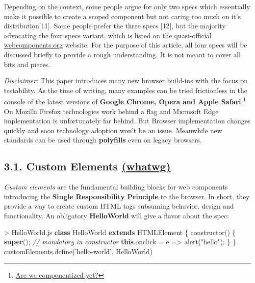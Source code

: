 \documentclass[]{article}
\newenvironment{Shaded}{}{}
\newcommand{\KeywordTok}[1]{\textcolor[rgb]{0.00,0.44,0.13}{\textbf{{#1}}}}
\newcommand{\StringTok}[1]{\textcolor[rgb]{0.25,0.44,0.63}{{#1}}}
\newcommand{\CommentTok}[1]{\textcolor[rgb]{0.38,0.63,0.69}{\textit{{#1}}}}
\newcommand{\VariableTok}[1]{\textcolor[rgb]{0.10,0.09,0.49}{{#1}}}
\newcommand{\OperatorTok}[1]{\textcolor[rgb]{0.40,0.40,0.40}{{#1}}}
\newcommand{\AttributeTok}[1]{\textcolor[rgb]{0.49,0.56,0.16}{{#1}}}
\newcommand{\NormalTok}[1]{{#1}}
\begin{document}
Depending on the context, some people argue for only two specs which
essentially make it possible to create a scoped component but not caring
too much on it's distribution{[}11{]}. Some people prefer the three
specs {[}12{]}, but the majority advocating the four specs variant,
which is listed on the quasi-official
\href{http://webcomponents.org}{webcomponents.org} website. For the
purpose of this article, all four specs will be discussed briefly to
provide a rough understanding. It is not meant to cover all bits and
pieces.

\emph{Disclaimer:} This paper introduces many new browser build-ins with
the focus on testability. As the time of writing, many examples can be
tried frictionless in the console of the latest versions of
\textbf{Google Chrome, Opera and Apple Safari}.\footnote{\href{http://jonrimmer.github.io/are-we-componentized-yet/}{Are
  we componentized yet?}} On Mozilla Firefox technologies work behind a
flag and Microsoft Edge implementation is unfortunately far behind. But
Browser implementation changes quickly and soon technology adoption
won't be an issue. Meanwhile new standards can be used through
\textbf{polyfills} even on legacy browsers.

\subsection{\texorpdfstring{3.1. Custom Elements
\href{https://html.spec.whatwg.org/multipage/scripting.html\#custom-elements}{(whatwg)}}{3.1. Custom Elements (whatwg)}}\label{custom-elements-whatwg}

\emph{Custom elements} are the fundamental building blocks for web
components introducing the \textbf{Single Responsibility Principle} to
the browser. In short, they provide a way to create custom HTML tags
subsuming behavior, design and functionality. An obligatory
\textbf{HelloWorld} will give a flavor about the spec:

\begin{Shaded}
\begin{Highlighting}[]
\OperatorTok{>} \VariableTok{HelloWorld}\NormalTok{.}\AttributeTok{js}
\KeywordTok{class} \NormalTok{HelloWorld }\KeywordTok{extends} \NormalTok{HTMLElement }\OperatorTok{\{}
 \AttributeTok{constructor}\NormalTok{() }\OperatorTok{\{}
  \KeywordTok{super}\NormalTok{()}\OperatorTok{;} \CommentTok{// mandatory in constructor}
  \KeywordTok{this}\NormalTok{.}\AttributeTok{onclick} \OperatorTok{=} \NormalTok{e }\OperatorTok{=>} \AttributeTok{alert}\NormalTok{(}\StringTok{"hello"}\NormalTok{)}\OperatorTok{;}
 \OperatorTok{\}}
\OperatorTok{\}}
\VariableTok{customElements}\NormalTok{.}\AttributeTok{define}\NormalTok{(}\StringTok{'hello-world'}\OperatorTok{,} \NormalTok{HelloWorld)}
\end{Highlighting}
\end{Shaded}
\end{document}
